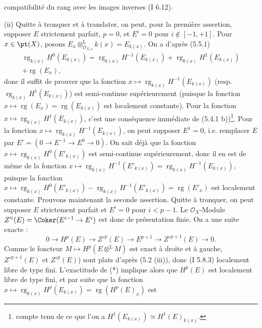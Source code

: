 compatibilité du rang avec les images inverses (I 6.12).

(ii) Quitte à tronquer et à translater, on peut, pour la première assertion, supposer \(E\) strictement parfait, \(p=0\), et \(E^i=0\) pour \(i\notin[-1,+1]\). Pour \(x\in\pt(X)\), posons \(E_x\otimes_{\mathcal O_{X,x}}^{\mathrm L}k(x)=E_{k(x)}\). On a d'après (5.5.1)
\[
\begin{gathered}
 \operatorname{rg}_{k(x)}H^0(E_{k(x)})=\operatorname{rg}_{k(x)}H^{-1}(E_{k(x)})+\operatorname{rg}_{k(x)}H^1(E_{k(x)})\\
 +\operatorname{rg}(E_x),
\end{gathered}
\]
donc il suffit de prouver que la fonction \(x\mapsto\operatorname{rg}_{k(x)}H^{-1}(E_{k(x)})\) (resp. \(\operatorname{rg}_{k(x)}H^1(E_{k(x)})\)) est semi-continue supérieurement (puisque la fonction \(x\mapsto\operatorname{rg}(E_x)=\operatorname{rg}(E_{k(x)})\) est localement constante). Pour la fonction \(x\mapsto\operatorname{rg}_{k(x)}H^1(E_{k(x)})\), c'est une conséquence immédiate de (5.4.1 b))\footnote{compte tenu de ce que l'on a \(H^1(E_{k(x)})\simeq H^1(E)_{k(x)}\).}. Pour la fonction \(x\mapsto\operatorname{rg}_{k(x)}H^{-1}(E_{k(x)})\), on peut supposer \(E^1=0\), i.e. remplacer \(E\) par \(E'=(0\to E^{-1}\to E^0\to0)\). On sait déjà que la fonction \(x\mapsto\operatorname{rg}_{k(x)}H^0(E'_{k(x)})\) est semi-continue supérieurement, donc il en est de même de la fonction \(x\mapsto\operatorname{rg}_{k(x)}H^{-1}(E'_{k(x)})=\operatorname{rg}_{k(x)}H^{-1}(E_{k(x)})\), puisque la fonction \(x\mapsto\operatorname{rg}_{k(x)}H^0(E'_{k(x)})-\operatorname{rg}_{k(x)}H^{-1}(E'_{k(x)})=\operatorname{rg}(E'_x)\) est localement constante. Prouvons maintenant la seconde assertion. Quitte à tronquer, on peut supposer \(E\) strictement parfait et \(E^i=0\) pour \(i<p-1\). Le \(\mathcal O_X\)-Module \(Z'^i(E)=\Coker(E^{i-1}\to E^i)\) est donc de présentation finie. On a une suite exacte :
\begin{equation}
 0\to H^p(E)\to Z'^p(E)\to E^{p+1}\to Z'^{p+1}(E)\to0.\tag{$*$}
\end{equation}
Comme le foncteur \(M\mapsto H^p(E\otimes^{\mathrm L}M)\) est exact à droite et à gauche, \(Z'^{p+1}(E)\) et \(Z'^p(E)\)) sont plats d'après (5.2 (iii)), donc (I 5.8.3) localement libre de type fini. L'exactitude de (*) implique alors que \(H^p(E)\) est localement libre de type fini, et par suite que la fonction \(x\mapsto\operatorname{rg}_{k(x)}H^p(E_{k(x)})=\operatorname{rg}(H^p(E)_x)\) est
